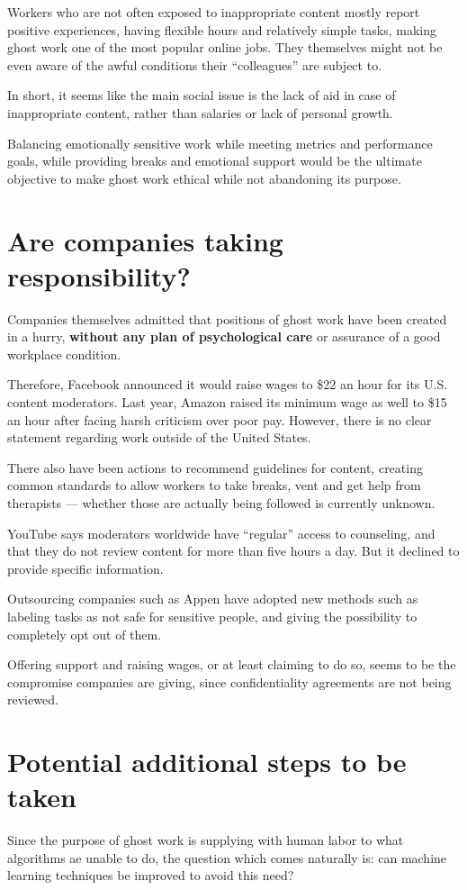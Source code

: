 \documentclass[12pt]{article}
\begin{document}
	Workers who are not often exposed to inappropriate content mostly report positive experiences, having flexible hours and relatively simple tasks, making ghost work one of the most popular online jobs. They themselves might not be even aware of the awful conditions their “colleagues” are subject to.
	
	In short, it seems like the main social issue is the lack of aid in case of inappropriate content, rather than salaries or lack of personal growth.
	
	Balancing emotionally sensitive work while meeting metrics and performance goals, while providing breaks and emotional support\cite{washington} would be the ultimate objective to make ghost work ethical while not abandoning its purpose. 
	
	\section{Are companies taking responsibility?}
	Companies themselves admitted that positions of ghost work have been created in a hurry, \textbf{without any plan of psychological care} or assurance of a good workplace condition\cite{washington}. 
	
	Therefore, Facebook announced it would raise wages to \$22 an hour for its U.S. content moderators. Last year, Amazon raised its minimum wage as well to \$15 an hour after facing harsh criticism over poor pay\cite{bi}. However, there is no clear statement regarding work outside of the United States.
	
	There also have been actions to recommend guidelines for content, creating common standards to allow workers to take breaks, vent and get help from therapists --- whether those are actually being followed is currently unknown. 
	
	YouTube says moderators worldwide have “regular” access to counseling, and that they do not review content for more than five hours a day. But it declined to provide specific information.
	
	Outsourcing companies such as Appen have adopted new methods such as labeling tasks as not safe for sensitive people, and giving the possibility to completely opt out of them. 
	
	Offering support and raising wages, or at least claiming to do so, seems to be the compromise companies are giving, since confidentiality agreements are not being reviewed. 
	
	\section{Potential additional steps to be taken}
	Since the purpose of ghost work is supplying with human labor to what algorithms ae unable to do, the question which comes naturally is: can machine learning techniques be improved to avoid this need? 
	
\end{document}
